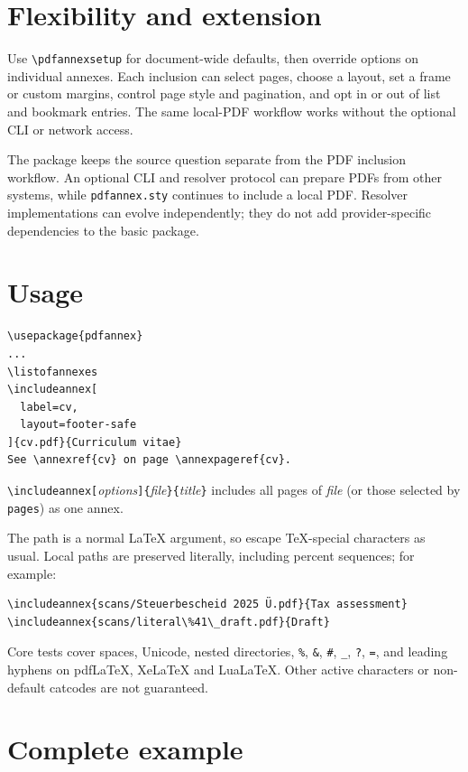 \documentclass{article}
\begin{document}
\section{Flexibility and extension}

Use \verb|\pdfannexsetup| for document-wide defaults, then override options on
individual annexes. Each inclusion can select pages, choose a layout, set a
frame or custom margins, control page style and pagination, and opt in or out
of list and bookmark entries. The same local-PDF workflow works without the
optional CLI or network access.

The package keeps the source question separate from the PDF inclusion
workflow. An optional CLI and resolver protocol can prepare PDFs from other
systems, while \texttt{pdfannex.sty} continues to include a local PDF. Resolver
implementations can evolve independently; they do not add provider-specific
dependencies to the basic package.

\section{Usage}

\begin{verbatim}
\usepackage{pdfannex}
...
\listofannexes
\includeannex[
  label=cv,
  layout=footer-safe
]{cv.pdf}{Curriculum vitae}
See \annexref{cv} on page \annexpageref{cv}.
\end{verbatim}


\verb|\includeannex[|\emph{options}\verb|]{|\emph{file}\verb|}{|\emph{title}\verb|}|
includes all pages of \emph{file} (or those selected by \texttt{pages}) as one
annex.

The path is a normal LaTeX argument, so escape TeX-special characters as usual.
Local paths are preserved literally, including percent sequences; for example:

\begin{verbatim}
\includeannex{scans/Steuerbescheid 2025 Ü.pdf}{Tax assessment}
\includeannex{scans/literal\%41\_draft.pdf}{Draft}
\end{verbatim}

Core tests cover spaces, Unicode, nested directories, \texttt{\%}, \texttt{\&},
\texttt{\#}, \texttt{\_}, \texttt{?}, \texttt{=}, and leading hyphens on
pdfLaTeX, XeLaTeX and LuaLaTeX. Other active characters or non-default
catcodes are not guaranteed.

\section{Complete example}
\end{document}
